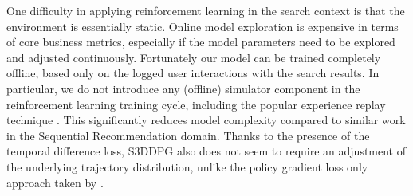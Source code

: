 One difficulty in applying reinforcement learning in the search context is that the environment is essentially static. Online model exploration is expensive in terms of core business metrics, especially if the model parameters need to be explored and adjusted continuously. Fortunately our model can be trained completely offline, based only on the logged user interactions with the search results. In particular, we do not introduce any (offline) simulator component in the reinforcement learning training cycle, including the popular experience replay technique \cite{mnih2015human}. This significantly reduces model complexity compared to similar work \cite{zhao2017deep} in the Sequential Recommendation domain. Thanks to the presence of the temporal difference loss, S3DDPG also does not seem to require an adjustment of the underlying trajectory distribution, unlike the policy gradient loss only approach taken by \cite{chen2019top}.









